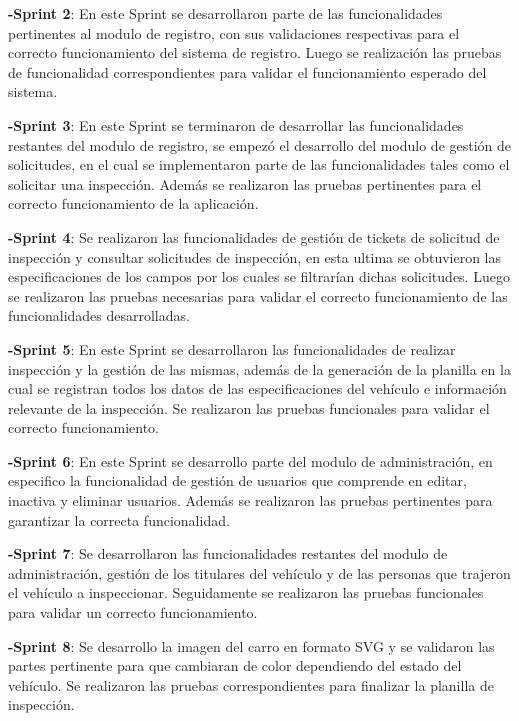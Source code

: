 \textbf{-Sprint 2}: En este Sprint se desarrollaron parte de las funcionalidades pertinentes al modulo de registro, con sus validaciones respectivas para el correcto funcionamiento del sistema de registro. Luego se realización las pruebas de funcionalidad correspondientes para validar el funcionamiento esperado del sistema.

\textbf{-Sprint 3}: En este Sprint se terminaron de desarrollar las funcionalidades restantes del modulo de registro, se empezó el desarrollo del modulo de gestión de solicitudes, en el cual se implementaron parte de las funcionalidades tales como el solicitar una inspección. Además se realizaron las pruebas pertinentes para el correcto funcionamiento de la aplicación.

\textbf{-Sprint 4}: Se realizaron las funcionalidades de gestión de tickets de solicitud de inspección y consultar solicitudes de inspección, en esta ultima se obtuvieron las especificaciones de los campos por los cuales se filtrarían dichas solicitudes. Luego se realizaron las pruebas necesarias para validar el correcto funcionamiento de las funcionalidades desarrolladas.

\textbf{-Sprint 5}: En este Sprint se desarrollaron las funcionalidades de realizar inspección y la gestión de las mismas, además de la generación de la planilla en la cual se registran todos los datos de las especificaciones del vehículo e información relevante de la inspección. Se realizaron las pruebas funcionales para validar el correcto funcionamiento.

\textbf{-Sprint 6}: En este Sprint se desarrollo parte del modulo de administración, en especifico la funcionalidad de gestión de usuarios que comprende en editar, inactiva y eliminar usuarios. Además se realizaron las pruebas pertinentes para garantizar la correcta funcionalidad.

\textbf{-Sprint 7}: Se desarrollaron las funcionalidades restantes del modulo de administración, gestión de los titulares del vehículo y de las personas que trajeron el vehículo a inspeccionar. Seguidamente se realizaron las pruebas funcionales para validar un correcto funcionamiento.

\textbf{-Sprint 8}: Se desarrollo la imagen del carro en formato SVG y se validaron las partes pertinente para que cambiaran de color dependiendo del estado del vehículo. Se realizaron las pruebas correspondientes para finalizar la planilla de inspección.

\setlength{\parskip}{0mm}



